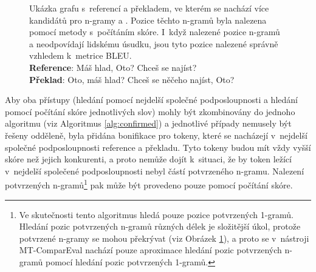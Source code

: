 \begin{figure}[h!]

	\caption{
		Ukázka grafu s~referencí a překladem, ve kterém se nachází více kandidátů pro \mbox{n-gramy}  a \uv{,}.
		Pozice těchto \mbox{n-gramů} byla nalezena pomocí metody s~počítáním skóre.
		I~když nalezené pozice \mbox{n-gramů}  a \uv{,} neodpovídají lidskému úsudku,
		jsou tyto pozice nalezené správně vzhledem k~metrice BLEU. \\
		\textbf{Reference}: Máš hlad, Oto? Chceš se najíst?\\
		\textbf{Překlad}: Oto, máš hlad? Chceš se něčeho najíst, Oto?
	}
	\label{img:graph-6}
\end{figure}
  
Aby oba přístupy (hledání pomocí nejdelší společné podposloupnosti a hledání pomocí počítání skóre jednotlivých slov) mohly být zkombinovány do jednoho algoritmu (viz Algoritmus \ref{alg:confirmed}) a
  jednotlivé případy nemusely být řešeny odděleně,
  byla přidána bonifikace pro tokeny,
  které se nacházejí v~nejdelší společné podposloupnosti reference a překladu.
Tyto tokeny budou mít vždy vyšší skóre než jejich konkurenti,
  a proto nemůže dojít k~situaci,
  že by token ležící v~nejdelší společené podposloupnosti nebyl částí potvrzeného \mbox{n-gramu}.
Nalezení potvrzených \mbox{n-gramů}\footnote{
  Ve skutečnosti tento algoritmus hledá pouze pozice potvrzených \mbox{1-gramů}.
  Hledání pozic potvrzených \mbox{n-gramů} různých délek je složitější úkol, protože potvrzené \mbox{n-gramy} se mohou překrývat (viz Obrázek \ref{img:graph-6}),
  a proto se v~nástroji \mbox{MT-ComparEval} nachází pouze aproximace hledání pozic potvrzených \mbox{n-gramů} pomocí hledání pozic potvrzených \mbox{1-gramů}.
  }
  pak může být provedeno pouze pomocí počítání skóre.



